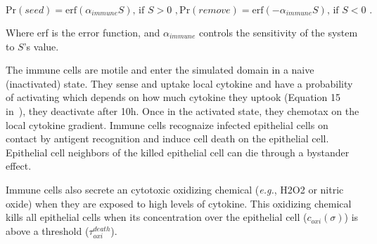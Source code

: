 \begin{subequations}\label{eq:sego-aponte:immune-prob}
    \begin{equation}\label{eq:sego-aponte:immune-prob:add}
        \text{Pr}(seed) = \text{erf}(\alpha_{immune}S)\text{, if } S>0\,\,,
    \end{equation}
    \begin{equation}\label{eq:sego-aponte:immune-prob:remove}
        \text{Pr}(remove) = \text{erf}(-\alpha_{immune}S)\text{, if } S<0\,\,.
    \end{equation}
\end{subequations}

\noindent Where erf is the error function, and $\alpha_{immune}$ controls the sensitivity of the system to $S$'s value.

The immune cells are motile and enter the simulated domain in a naive (inactivated) state. They sense and uptake local cytokine and have a probability of activating which depends on how much cytokine they uptook (Equation 15 in~\cite{sego_modular_2020}), they deactivate after 10h. Once in the activated state, they chemotax on the local cytokine gradient. Immune cells recognaize infected epithelial cells on contact by antigent recognition and induce cell death on the epithelial cell. Epithelial cell neighbors of the killed epithelial cell can die through a bystander effect.

Immune cells also secrete an cytotoxic oxidizing chemical (\textit{e.g.}, H2O2 or nitric oxide) when they are exposed to high levels of cytokine. This oxidizing chemical kills all epithelial cells when its concentration over the epithelial cell ($c_{oxi}(\sigma)$) is above a threshold ($\tau^{death}_{oxi}$).





